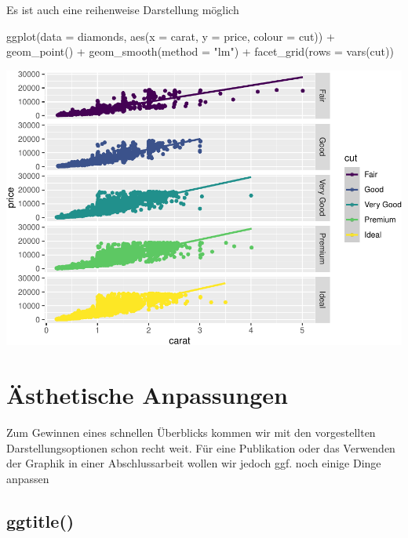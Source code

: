 \documentclass[
]{book}
\newenvironment{Shaded}{\begin{snugshade}}{\end{snugshade}}
\newcommand{\AttributeTok}[1]{\textcolor[rgb]{0.77,0.63,0.00}{#1}}
\newcommand{\FunctionTok}[1]{\textcolor[rgb]{0.00,0.00,0.00}{#1}}
\newcommand{\NormalTok}[1]{#1}
\newcommand{\SpecialCharTok}[1]{\textcolor[rgb]{0.00,0.00,0.00}{#1}}
\newcommand{\StringTok}[1]{\textcolor[rgb]{0.31,0.60,0.02}{#1}}
\begin{document}
Es ist auch eine reihenweise Darstellung möglich

\begin{Shaded}
\begin{Highlighting}[]
\FunctionTok{ggplot}\NormalTok{(}\AttributeTok{data =}\NormalTok{ diamonds, }\FunctionTok{aes}\NormalTok{(}\AttributeTok{x =}\NormalTok{ carat, }\AttributeTok{y =}\NormalTok{ price, }\AttributeTok{colour =}\NormalTok{ cut)) }\SpecialCharTok{+}
  \FunctionTok{geom\_point}\NormalTok{() }\SpecialCharTok{+}
  \FunctionTok{geom\_smooth}\NormalTok{(}\AttributeTok{method =} \StringTok{"lm"}\NormalTok{) }\SpecialCharTok{+}
  \FunctionTok{facet\_grid}\NormalTok{(}\AttributeTok{rows =} \FunctionTok{vars}\NormalTok{(cut))}
\end{Highlighting}
\end{Shaded}

\includegraphics{CFH_R_bookdown_files/figure-latex/unnamed-chunk-172-1.pdf}

\hypertarget{uxe4sthetische-anpassungen}{%
\section{Ästhetische Anpassungen}\label{uxe4sthetische-anpassungen}}

Zum Gewinnen eines schnellen Überblicks kommen wir mit den vorgestellten Darstellungsoptionen schon recht weit. Für eine Publikation oder das Verwenden der Graphik in einer Abschlussarbeit wollen wir jedoch ggf. noch einige Dinge anpassen

\hypertarget{ggtitle}{%
\subsection{ggtitle()}\label{ggtitle}}
\end{document}
